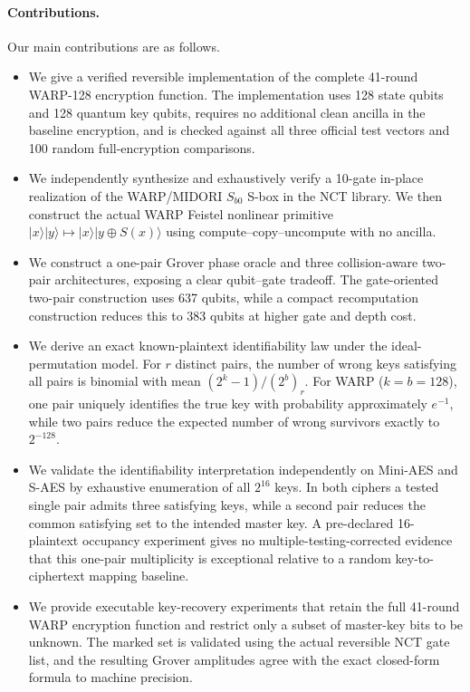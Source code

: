 \documentclass[10pt,a4paper]{article}
\providecommand{\ket}[1]{\lvert #1\rangle}
\begin{document}
\paragraph{Contributions.}
Our main contributions are as follows.
\begin{itemize}
    \item We give a verified reversible implementation of the complete 41-round WARP-128 encryption function. The implementation uses 128 state qubits and 128 quantum key qubits, requires no additional clean ancilla in the baseline encryption, and is checked against all three official test vectors and 100 random full-encryption comparisons.
    \item We independently synthesize and exhaustively verify a 10-gate in-place realization of the WARP/MIDORI $S_{b0}$ S-box in the NCT library. We then construct the actual WARP Feistel nonlinear primitive $\ket{x}\ket{y}\mapsto\ket{x}\ket{y\oplus S(x)}$ using compute--copy--uncompute with no ancilla.
    \item We construct a one-pair Grover phase oracle and three collision-aware two-pair architectures, exposing a clear qubit--gate tradeoff. The gate-oriented two-pair construction uses 637 qubits, while a compact recomputation construction reduces this to 383 qubits at higher gate and depth cost.
    \item We derive an exact known-plaintext identifiability law under the ideal-permutation model.  For $r$ distinct pairs, the number of wrong keys satisfying all pairs is binomial with mean $(2^k-1)/(2^b)_r$.  For WARP ($k=b=128$), one pair uniquely identifies the true key with probability approximately $e^{-1}$, while two pairs reduce the expected number of wrong survivors exactly to $2^{-128}$.
    \item We validate the identifiability interpretation independently on Mini-AES and S-AES by exhaustive enumeration of all $2^{16}$ keys.  In both ciphers a tested single pair admits three satisfying keys, while a second pair reduces the common satisfying set to the intended master key.  A pre-declared 16-plaintext occupancy experiment gives no multiple-testing-corrected evidence that this one-pair multiplicity is exceptional relative to a random key-to-ciphertext mapping baseline.
    \item We provide executable key-recovery experiments that retain the full 41-round WARP encryption function and restrict only a subset of master-key bits to be unknown. The marked set is validated using the actual reversible NCT gate list, and the resulting Grover amplitudes agree with the exact closed-form formula to machine precision.

\end{itemize}
\end{document}
